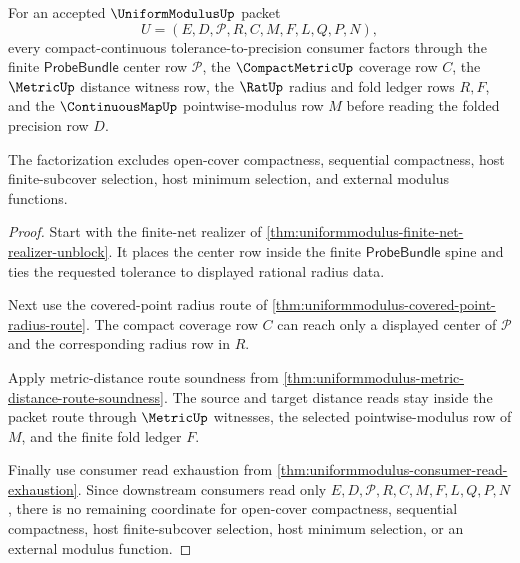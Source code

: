 \begin{theorem}
\label{thm:uniformmodulus-compact-metric-threshold-factorization}
For an accepted $\UniformModulusUp$ packet
$$
U=(E,D,\mathcal{P},R,C,M,F,L,Q,P,N),
$$
every compact-continuous tolerance-to-precision consumer factors through the finite $\mathsf{ProbeBundle}$ center row $\mathcal{P}$, the $\CompactMetricUp$ coverage row $C$, the $\MetricUp$ distance witness row, the $\RatUp$ radius and fold ledger rows $R,F$, and the $\ContinuousMapUp$ pointwise-modulus row $M$ before reading the folded precision row $D$.

The factorization excludes open-cover compactness, sequential compactness, host finite-subcover selection, host minimum selection, and external modulus functions.
\end{theorem}
\begin{proof}
Start with the finite-net realizer of \autoref{thm:uniformmodulus-finite-net-realizer-unblock}. It places the center row inside the finite $\mathsf{ProbeBundle}$ spine and ties the requested tolerance to displayed rational radius data.

Next use the covered-point radius route of \autoref{thm:uniformmodulus-covered-point-radius-route}. The compact coverage row $C$ can reach only a displayed center of $\mathcal{P}$ and the corresponding radius row in $R$.

Apply metric-distance route soundness from \autoref{thm:uniformmodulus-metric-distance-route-soundness}. The source and target distance reads stay inside the packet route through $\MetricUp$ witnesses, the selected pointwise-modulus row of $M$, and the finite fold ledger $F$.

Finally use consumer read exhaustion from \autoref{thm:uniformmodulus-consumer-read-exhaustion}. Since downstream consumers read only $E,D,\mathcal{P},R,C,M,F,L,Q,P,N$, there is no remaining coordinate for open-cover compactness, sequential compactness, host finite-subcover selection, host minimum selection, or an external modulus function.
\end{proof}

